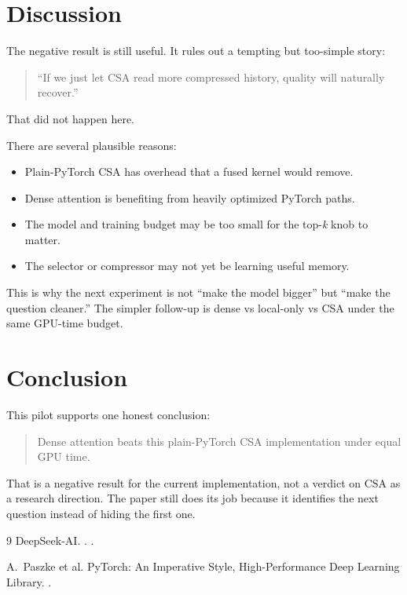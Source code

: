 \documentclass[10pt,twocolumn]{article}
\begin{document}
\section{Discussion}

The negative result is still useful. It rules out a tempting but too-simple
story:

\begin{quote}
``If we just let CSA read more compressed history, quality will naturally
recover.''
\end{quote}

That did not happen here.

There are several plausible reasons:

\begin{itemize}
\item Plain-PyTorch CSA has overhead that a fused kernel would remove.
\item Dense attention is benefiting from heavily optimized PyTorch paths.
\item The model and training budget may be too small for the top-\emph{k}
knob to matter.
\item The selector or compressor may not yet be learning useful memory.
\end{itemize}

This is why the next experiment is not ``make the model bigger'' but ``make the
question cleaner.'' The simpler follow-up is dense vs local-only vs CSA under
the same GPU-time budget.

\section{Conclusion}

This pilot supports one honest conclusion:

\begin{quote}
Dense attention beats this plain-PyTorch CSA implementation under equal GPU
time.
\end{quote}

That is a negative result for the current implementation, not a verdict on CSA
as a research direction. The paper still does its job because it identifies the
next question instead of hiding the first one.

\begin{thebibliography}{9}
DeepSeek-AI.
.
.

A.~Paszke et al.
\newblock PyTorch: An Imperative Style, High-Performance Deep Learning Library.
.
\end{thebibliography}
\end{document}
